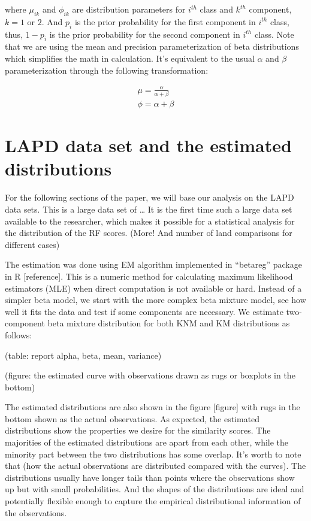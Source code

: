 \documentclass[]{elsarticle} %
\begin{document}
where \(\mu_{ik}\) and \(\phi_{ik}\) are distribution parameters for
\(i^{th}\) class and \(k^{th}\) component, \(k = 1\) or \(2\). And
\(p_i\) is the prior probability for the first component in \(i^{th}\)
class, thus, \(1-p_i\) is the prior probability for the second component
in \(i^{th}\) class. Note that we are using the mean and precision
parameterization of beta distributions which simplifies the math in
calculation. It's equivalent to the usual \(\alpha\) and \(\beta\)
parameterization through the following transformation:

\begin{align*}
\mu = \frac{\alpha}{\alpha+\beta} \\
\phi = \alpha + \beta
\end{align*}

\hypertarget{lapd-data-set-and-the-estimated-distributions}{%
\section{LAPD data set and the estimated
distributions}\label{lapd-data-set-and-the-estimated-distributions}}

For the following sections of the paper, we will base our analysis on
the LAPD data sets. This is a large data set of \ldots{} It is the first
time such a large data set available to the researcher, which makes it
possible for a statistical analysis for the distribution of the RF
scores. (More! And number of land comparisons for different cases)

The estimation was done using EM algorithm implemented in ``betareg''
package in R {[}reference{]}. This is a numeric method for calculating
maximum likelihood estimators (MLE) when direct computation is not
available or hard. Instead of a simpler beta model, we start with the
more complex beta mixture model, see how well it fits the data and test
if some components are necessary. We estimate two-component beta mixture
distribution for both KNM and KM distributions as follows:

(table: report alpha, beta, mean, variance)

(figure: the estimated curve with observations drawn as rugs or boxplots
in the bottom)

The estimated distributions are also shown in the figure {[}figure{]}
with rugs in the bottom shown as the actual observations. As expected,
the estimated distributions show the properties we desire for the
similarity scores. The majorities of the estimated distributions are
apart from each other, while the minority part between the two
distributions has some overlap. It's worth to note that (how the actual
observations are distributed compared with the curves). The
distributions usually have longer tails than points where the
observations show up but with small probabilities. And the shapes of the
distributions are ideal and potentially flexible enough to capture the
empirical distributional information of the observations.
\end{document}
